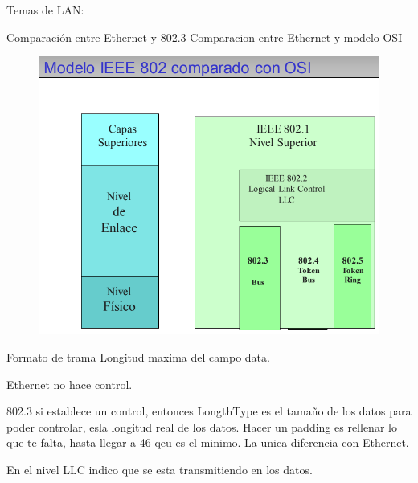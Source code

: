 Temas de LAN:

Comparación entre Ethernet y 802.3
Comparacion entre Ethernet y modelo OSI
\begin{figure}[h]
	\centering
	\includegraphics[width=0.7\linewidth]{"screenshot0021"}
	\caption{}
	\label{fig:screenshot0021}
\end{figure}

Formato de trama
Longitud maxima del campo data.

Ethernet no hace control.

802.3 si establece un control, entonces LongthType es el tamaño de los datos para poder controlar, esla longitud real de los datos. Hacer un padding es rellenar lo que te falta, hasta llegar a 46 qeu es el minimo. La unica diferencia con Ethernet.

En el nivel LLC indico que se esta transmitiendo en los datos.